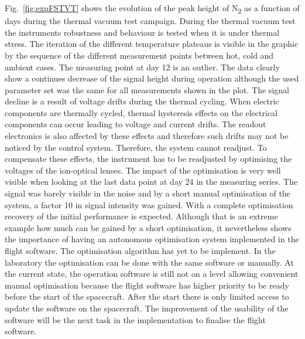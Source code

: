 		Fig.~\ref{fig:expFSTVT} shows the evolution of the peak height of N\textsubscript{2} as a function of days during the thermal vacuum test campaign. During the thermal vacuum test the instruments robustness and behaviour is tested when it is under thermal stress. The iteration of the different temperature plateaus is visible in the graphic by the sequence of the different measurement points between hot, cold and ambient cases. The measuring point at day 12 is an outlier. The data clearly show a continues decrease of the signal height during operation although the used parameter set was the same for all measurements shown in the plot. The signal decline is a result of voltage drifts during the thermal cycling. When electric components are thermally cycled, thermal hysteresis effects on the electrical components can occur leading to voltage and current drifts. The readout electronics is also affected by these effects and therefore such drifts may not be noticed by the control system. Therefore, the system cannot readjust. To compensate these effects, the instrument has to be readjusted by optimising the voltages of the ion-optical lenses. The impact of the optimisation is very well visible when looking at the last data point at day 24 in the measuring series. The signal was barely visible in the noise and by a short manual optimisation of the system, a factor 10 in signal intensity was gained. With a complete optimisation recovery of the initial performance is expected. Although that is an extreme example how much can be gained by a short optimisation, it nevertheless shows the importance of having an autonomous optimisation system implemented in the flight software. The optimisation algorithm has yet to be implement. In the laboratory the optimisation can be done with the same software or manually. At the current state, the operation software is still not on a level allowing convenient manual optimisation because the flight software has higher priority to be ready before the start of the spacecraft. After the start there is only limited access to update the software on the spacecraft. The improvement of the usability of the software will be the next task in the implementation to finalise the flight software.
		
		
		
	
	
	
	
